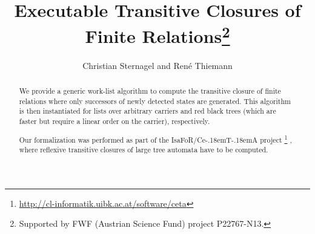 \documentclass[11pt,a4paper]{article}
\newcommand\isafor{\textsf{IsaFoR}}
\newcommand\ceta{\textsf{Ce\kern-.18emT\kern-.18emA}}
\begin{document}
\title{Executable Transitive Closures of Finite Relations\footnote{Supported by FWF (Austrian Science Fund) project P22767-N13.}}
\author{Christian Sternagel and Ren\'e Thiemann}
\maketitle

\begin{abstract}
  We provide a generic work-list algorithm to compute the transitive closure of
  finite relations where only successors of newly detected states are generated.
  This algorithm is then instantiated for lists over arbitrary carriers and red
  black trees (which are faster but require a linear order on the
  carrier), respectively. 

  Our formalization was performed as part of the \isafor/\ceta{} project%
  \footnote{\url{http://cl-informatik.uibk.ac.at/software/ceta}} \cite{CeTA},
  where reflexive transitive closures of large tree automata have to be
  computed.
\end{abstract}

\tableofcontents








\end{document}
